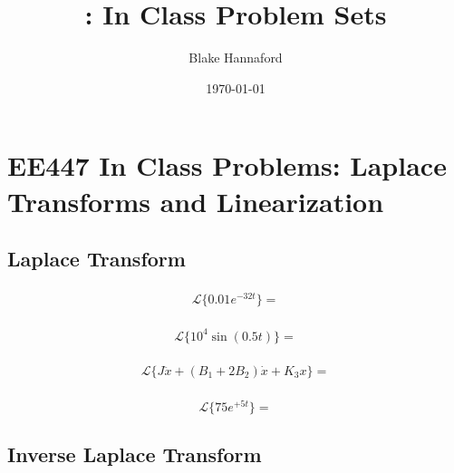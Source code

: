 \documentclass{article}	%
\title{\EEcourse: In Class Problem Sets  }
\author{Blake Hannaford}
\date{\today}
\newcommand{\sL}{\mathcal{L}}
\begin{document}
\maketitle


\section{EE447 In Class Problems: Laplace Transforms and Linearization}	%




\subsection{Laplace Transform}          %
 \subsubsection{}

\[
 \sL\{0.01e^{-32t} \} =
\]

%
%
 \subsubsection{}

\[
 \sL \{ 10^4 \sin(0.5t)\} =
\]
%
\subsubsection{}

\[
 \sL \{ J\ddot{x} + (B_1+2B_2)\dot{x}+K_3x\} =
\]

%
%
%
\subsubsection{}

\[
 \sL \{ 75e^{+5t} \} =
\]
%
%
\subsection{Inverse Laplace Transform}
\end{document}
